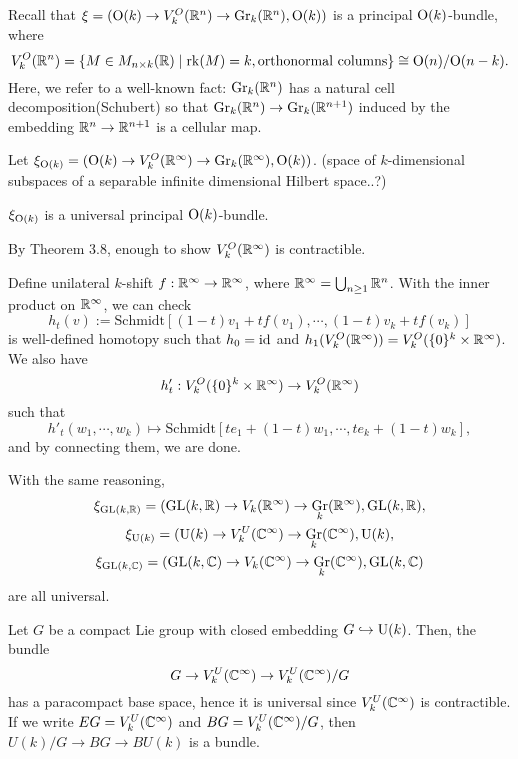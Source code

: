 \documentclass{../../small}
\DeclareMathOperator{\Gr}{Gr}
\begin{document}
\begin{ex*}
Recall that $\xi=(\mathrm{O}(k)\to V_k^O(\mathbb{R}^n)\to\mathrm{Gr}_k(\mathbb{R}^n),\mathrm{O}(k))$ is a principal $\mathrm{O}(k)$-bundle, where
\[V_k^O(\mathbb{R}^n)=\{M\in M_{n\times k}(\mathbb{R})\mid\operatorname{rk}(M)=k,\text{orthonormal columns}\}\cong\mathrm{O}(n)/\mathrm{O}(n-k).\]
Here, we refer to a well-known fact: $\mathrm{Gr}_k(\mathbb{R}^n)$ has a natural cell decomposition(Schubert) so that $\Gr_k(\R^n)\to\Gr_k(\R^{n+1})$ induced by the embedding $\mathbb{R}^n\to\mathbb{R}^{n+1}$ is a cellular map.

Let $\xi_{\rO(k)}=(\rO(k)\to V_k^O(\R^\infty)\to\Gr_k(\R^\infty),\rO(k))$.
(space of $k$-dimensional subspaces of a separable infinite dimensional Hilbert space..?)
\end{ex*}
\begin{thm*}[3.10]
$\xi_{\mathrm{O}(k)}$ is a universal principal $\mathrm{O}(k)$-bundle.
\end{thm*}
\begin{pf}
By Theorem 3.8, enough to show $V_k^O(\mathbb{R}^\infty)$ is contractible.

Define unilateral $k$-shift $f:\mathbb{R}^\infty\to\mathbb{R}^\infty$, where $\mathbb{R}^\infty=\bigcup_{n\ge1}\mathbb{R}^n$.
With the inner product on $\mathbb{R}^\infty$, we can check
\[h_t(v):=\mathrm{Schmidt}[(1-t)v_1+tf(v_1),\cdots,(1-t)v_k+tf(v_k)]\]
is well-defined homotopy such that $h_0=\operatorname{id}$ and $h_1(V_k^O(\mathbb{R}^\infty))=V_k^O(\{0\}^k\times\mathbb{R}^\infty)$.
We also have
\[h'_t:V_k^O(\{0\}^k\times\mathbb{R}^\infty)\to V_k^O(\mathbb{R}^\infty)\]
such that
\[h'_t(w_1,\cdots,w_k)\mapsto\mathrm{Schmidt}[te_1+(1-t)w_1,\cdots,te_k+(1-t)w_k],\]
and by connecting them, we are done.
\end{pf}
With the same reasoning,
\begin{gather*}
\xi_{\GL(k,\R)}=(\GL(k,\R)\to V_k(\R^\infty)\to\Gr_k(\R^\infty),\GL(k,\R),\\
\xi_{\rU(k)}=(\rU(k)\to V_k^U(\C^\infty)\to\Gr_k(\C^\infty),\rU(k),\\
\xi_{\GL(k,\C)}=(\GL(k,\C)\to V_k(\C^\infty)\to\Gr_k(\C^\infty),\GL(k,\C)
\end{gather*}
are all universal.

\begin{ex*}
Let $G$ be a compact Lie group with closed embedding $G\hookrightarrow\mathrm{U}(k)$.
Then, the bundle
\[G\to V_k^U(\mathbb{C}^\infty)\to V_k^U(\mathbb{C}^\infty)/G\]
has a paracompact base space, hence it is universal since $V_k^U(\mathbb{C}^\infty)$ is contractible.
If we write $EG=V_k^U(\mathbb{C}^\infty)$ and $BG=V_k^U(\mathbb{C}^\infty)/G$, then $U(k)/G\to BG\to BU(k)$ is a bundle.
\end{ex*}
\end{document}
